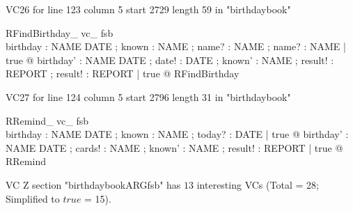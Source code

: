 \documentclass{article}
\begin{document}
VC26 for line 123 column 5 start 2729 length 59 in "birthdaybook"
\begin{theorem}{ RFindBirthday\_ vc\_ fsb}\\
 \forall birthday : NAME \pfun DATE ; known : \power NAME ; name? : NAME ; name? : NAME | true @ \exists birthday' : NAME \pfun DATE ; date! : DATE ; known' : \power NAME ; result! : REPORT ; result! : REPORT | true @ RFindBirthday \\

\end{theorem}

VC27 for line 124 column 5 start 2796 length 31 in "birthdaybook"
\begin{theorem}{ RRemind\_ vc\_ fsb}\\
 \forall birthday : NAME \pfun DATE ; known : \power NAME ; today? : DATE | true @ \exists birthday' : NAME \pfun DATE ; cards! : \power NAME ; known' : \power NAME ; result! : REPORT | true @ RRemind \\

\end{theorem}



 VC Z section "birthdaybookARGfsb" has $13$ interesting VCs (Total = 28; Simplified to $true$ = 15).



\end{document}
